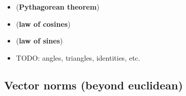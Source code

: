 \begin{itemize}

\item
   (\textbf{Pythagorean theorem})
\item
   (\textbf{law of
  cosines})
\item
  (\textbf{law of sines})
\item
  TODO: angles, triangles, identities, etc.
\end{itemize}

\subsection*{Vector norms (beyond
euclidean)}

